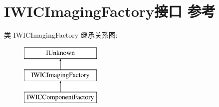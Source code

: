 \hypertarget{interface_i_w_i_c_imaging_factory}{}\section{I\+W\+I\+C\+Imaging\+Factory接口 参考}
\label{interface_i_w_i_c_imaging_factory}
类 I\+W\+I\+C\+Imaging\+Factory 继承关系图\+:\begin{figure}[H]
\begin{center}
\leavevmode
\includegraphics[height=3.000000cm]{interface_i_w_i_c_imaging_factory}
\end{center}
\end{figure}
